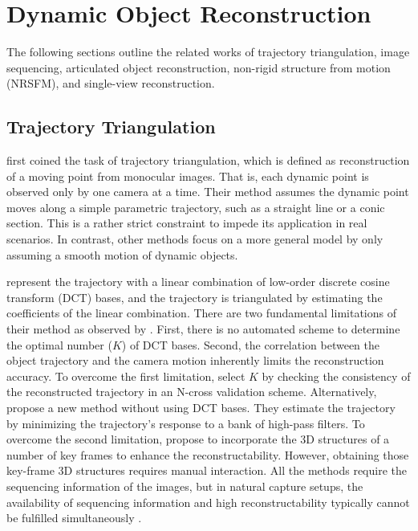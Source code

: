 \section{Dynamic Object Reconstruction}
The following sections outline the related works of trajectory triangulation, image sequencing, articulated object reconstruction,  non-rigid structure from motion (NRSFM), and single-view reconstruction.

\subsection{Trajectory Triangulation}
\citet{avidan2000trajectory} first coined the task of trajectory triangulation, which is defined as  reconstruction of a moving point from monocular images. That is, each dynamic point is observed only by one camera at a time. Their method assumes the dynamic point moves along a simple parametric trajectory, such as a straight line or a conic section. This is a rather strict constraint to impede its application in real scenarios. In contrast, other methods  \cite{Park_ECCV2010,Valmadre_CVPR2012,ZhuCL_CVPR11,park20153d} focus on a more general model by only assuming a smooth motion of dynamic objects.

\citet{Park_ECCV2010} represent the trajectory with a linear combination of low-order discrete cosine transform (DCT) bases, and the trajectory is triangulated by estimating the coefficients of the linear combination. There are two fundamental limitations of their method as observed by \citet{Valmadre_CVPR2012}. First, there is no automated scheme to determine the optimal number ($K$) of DCT bases. Second, the correlation between the object trajectory and the camera motion inherently limits the reconstruction accuracy. To overcome the first limitation, \citet{park20153d} select $K$ by checking the consistency of the reconstructed trajectory in an N-cross validation scheme.
Alternatively, \citet{Valmadre_CVPR2012} propose a new method without using DCT bases. They estimate the trajectory by minimizing the trajectory's response to a bank of high-pass filters. To overcome the second limitation, \citet{ZhuCL_CVPR11} propose to incorporate the 3D structures of a number of key frames to enhance the reconstructability. However, obtaining those key-frame 3D structures requires manual interaction. All the methods \cite{Park_ECCV2010,Valmadre_CVPR2012,ZhuCL_CVPR11} require the sequencing information of the images, but in natural capture setups, the availability of sequencing information and high reconstructability typically cannot be fulfilled simultaneously \cite{ZhuCL_CVPR11,park20153d}. 

